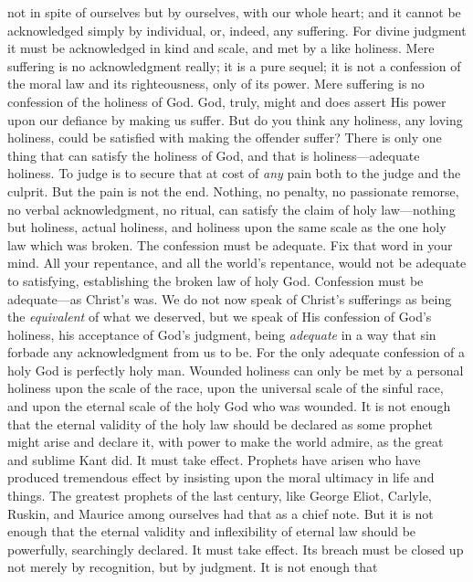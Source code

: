 \documentclass[12pt,letterpaper,oneside]{book}
\begin{document}
not in spite of ourselves but by 
ourselves, with our whole heart; and it cannot 
be acknowledged simply by individual, or, indeed, 
any suffering. For divine judgment it 
must be acknowledged in kind and scale, and 
met by a like holiness. Mere suffering is no 
acknowledgment really; it is a pure sequel; it 
is not a confession of the moral law and its 
righteousness, only of its power. Mere suffering 
is no confession of the holiness of God. God, 
truly, might and does assert His power upon 
our defiance by making us suffer. But do you 
think any holiness, any loving holiness, could 
be satisfied with making the offender suffer? 
There is only one thing that can satisfy the 
holiness of God, and that is holiness---adequate 
holiness. To judge is to secure that at cost of 
\textit{any} pain both to the judge and the culprit. But 
the pain is not the end. Nothing, no penalty, 
no passionate remorse, no verbal acknowledgment, 
no ritual, can satisfy the claim of holy 
law---nothing but holiness, actual holiness, and 
holiness upon the same scale as the one holy 
law which was broken. The confession must be 
adequate. Fix that word in your mind. All 
your repentance, and all the world's repentance, 
would not be adequate to satisfying, establishing 
the broken law of holy God. Confession 
must be adequate---as Christ's was. We do not 
now speak of Christ's sufferings as being the 
\textit{equivalent} of what we deserved, but we speak 
of His confession of God's holiness, his acceptance 
of God's judgment, being \textit{adequate} in a 
way that sin forbade any acknowledgment 
from us to be. For the only adequate confession 
of a holy God is perfectly holy man. 
Wounded holiness can only be met by a 
personal holiness upon the scale of the race, 
upon the universal scale of the sinful race, and 
upon the eternal scale of the holy God who was 
wounded. It is not enough that the eternal 
validity of the holy law should be declared as 
some prophet might arise and declare it, with 
power to make the world admire, as the great 
and sublime Kant did. It must take effect. 
Prophets have arisen who have produced 
tremendous effect by insisting upon the moral 
ultimacy in life and things. The greatest 
prophets of the last century, like George Eliot, 
Carlyle, Ruskin, and Maurice among ourselves 
had that as a chief note. But it is not 
enough that the eternal validity and inflexibility 
of eternal law should be powerfully, 
searchingly declared. It must take effect. Its 
breach must be closed up not merely by recognition, 
but by judgment. It is not enough that 
\end{document}
